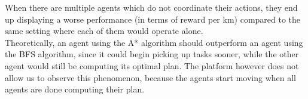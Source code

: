 \documentclass[10pt]{article}
\begin{document}
\noindent
When there are multiple agents which do not coordinate their actions, they end up displaying a worse performance (in terms of reward per km) compared to the same setting where each of them would operate alone.\\

\noindent
Theoretically, an agent using the A* algorithm should outperform an agent using the BFS algorithm, since it could begin picking up tasks sooner, while the other agent would still be computing its optimal plan.
The platform however does not allow us to observe this phenomenon, because the agents start moving when all agents are done computing their plan.
\end{document}
